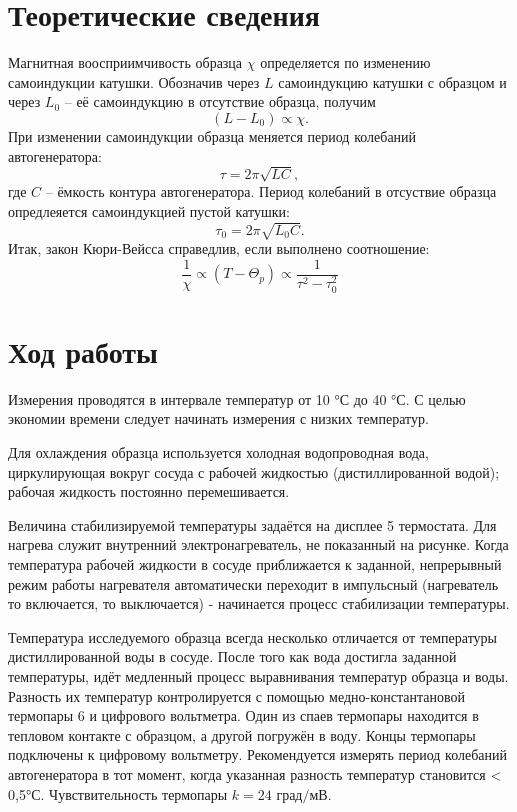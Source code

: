 \documentclass[a4paper, 12pt]{article}
\begin{document}
\section{Теоретические сведения}

Магнитная воосприимчивость образца $\chi$ определяется по изменению самоиндукции катушки. 
Обозначив через $L$ самоиндукцию катушки с образцом и через $L_0$ -- 
её самоиндукцию в отсутствие образца, получим
\begin{equation}
	(L-L_0)\propto \chi.
\end{equation}
При изменении самоиндукции образца меняется период колебаний автогенератора:
\begin{equation}
	\tau = 2\pi \sqrt{LC},
\end{equation}
где $C$ -- ёмкость контура автогенератора. Период колебаний в отсуствие образца опредлеяется самоиндукцией пустой катушки:
\begin{equation}
	\tau_0 = 2\pi \sqrt{L_0C}.
\end{equation}
Итак, закон Кюри-Вейсса справедлив, если выполнено соотношение:
\begin{equation}
	\frac{1}{\chi} \propto (T-\Theta_p) \propto \frac{1}{\tau^2-\tau_0^2}
\end{equation}

\section{Ход работы}

Измерения проводятся в интервале температур от 10 °С до 40 °С. С целью экономии времени следует начинать измерения с низких температур.

Для охлаждения образца используется холодная водопроводная вода, циркулирующая вокруг сосуда с рабочей жидкостью (дистиллированной водой); рабочая жидкость постоянно перемешивается.

Величина стабилизируемой температуры задаётся на дисплее 5 термостата. Для нагрева служит внутренний электронагреватель, не показанный на рисунке.
Когда температура рабочей жидкости в сосуде приближается к заданной, непрерывный режим работы нагревателя автоматически переходит в импульсный (нагреватель то включается, то выключается) - начинается процесс стабилизации температуры.

Температура исследуемого образца всегда несколько отличается от температуры дистиллированной воды в сосуде. После того как вода достигла заданной температуры, 
идёт медленный процесс выравнивания температур образца и воды. Разность их температур контролируется с помощью медно-константановой
термопары 6 и цифрового вольтметра. Один из спаев термопары находится в тепловом контакте с образцом, а другой погружён в воду. 
Концы термопары подключены к цифровому вольтметру. Рекомендуется измерять период колебаний автогенератора в тот момент, 
когда указанная разность температур становится < 0,5°С. Чувствительность термопары $k = 24 \text{ град/мВ}$.
\end{document}
